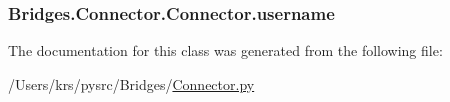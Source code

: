 \subsubsection[{username}]{\setlength{\rightskip}{0pt plus 5cm}Bridges.\+Connector.\+Connector.\+username}\label{class_bridges_1_1_connector_1_1_connector_aaf277a8d64bb59cae8a81d1a2f3086b1}


The documentation for this class was generated from the following file\+:\begin{DoxyCompactItemize}
\item 
/\+Users/krs/pysrc/\+Bridges/\hyperlink{_connector_8py}{Connector.\+py}\end{DoxyCompactItemize}
